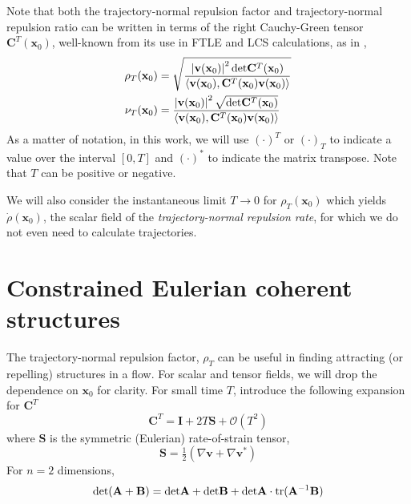\documentclass[onecolumn,3p]{elsarticle}
\begin{document}
	Note that both the trajectory-normal repulsion factor and trajectory-normal repulsion ratio can be written in terms of the right Cauchy-Green tensor $\mathbf{C}^T (\mathbf{x}_0)$, well-known from its use in FTLE and LCS calculations, as in \cite{haller_variational_2011},
	\begin{equation}
		\begin{aligned}
		\rho_T(\mathbf{x}_0) 
		& = \sqrt{ \frac{
				\left| \mathbf{v}(\mathbf{x}_0)\right|^2 {\rm det} \mathbf{C}^T (\mathbf{x}_0)}{
				\langle \mathbf{v}(\mathbf{x}_0),\mathbf{C}^T (\mathbf{x}_0) \mathbf{v}(\mathbf{x}_0) \rangle
			} } \\
		\nu_T(\mathbf{x}_0) 
		& =  \frac{
				\left| \mathbf{v}(\mathbf{x}_0)\right|^2 \sqrt{{\rm det} \mathbf{C}^T (\mathbf{x}_0)}}{
				\langle \mathbf{v}(\mathbf{x}_0),\mathbf{C}^T (\mathbf{x}_0) \mathbf{v}(\mathbf{x}_0) \rangle
			}
		\end{aligned}
		\label{eq: rhoT}
	\end{equation}
	As a matter of notation, in this work, we will use \((\cdot)^T\) or \((\cdot)_T\) to indicate a value over the interval $[0, T]$ and \((\cdot)^*\) to indicate the matrix transpose. Note that $T$ can be positive or negative. 
	
	We will also consider the instantaneous limit $T \rightarrow 0$ for $\rho_T(\mathbf{x}_0)$ which yields $\dot \rho(\mathbf{x}_0)$, the scalar field of the  {\it trajectory-normal repulsion rate}, for which we do not even need to calculate trajectories.
	
	\section{Constrained Eulerian coherent structures}
	The trajectory-normal repulsion factor, \(\rho_T\) can be useful in finding attracting (or repelling) structures in a flow. For scalar and tensor fields, we will drop the dependence on $\mathbf{x}_0$ for clarity.
	For small time \(T\), \cite{serra_objective_2016} introduce the following expansion for \(\mathbf{C}^T  \)
	\begin{equation}
	\mathbf{C}^T   = \mathbf{I} + 2 T \mathbf{S}  
	+ \mathcal{O}(T^2)
	\label{eq: CG Expansion}
	\end{equation}
	where $\mathbf{S}  $ is the symmetric (Eulerian) rate-of-strain tensor,
	\begin{equation}
	\mathbf{S}   = \tfrac{1}{2} \left( \nabla \mathbf{v}  + \nabla \mathbf{v} ^* \right)
	\end{equation}
	For $n=2$ dimensions,
	\begin{equation}
	{\rm det} (\mathbf{A} + \mathbf{B}) = {\rm det} \mathbf{A} + {\rm det} \mathbf{B} + {\rm det} \mathbf{A} \cdot {\rm tr}(\mathbf{A}^{-1} \mathbf{B}) 
	\end{equation}
	
\end{document}
